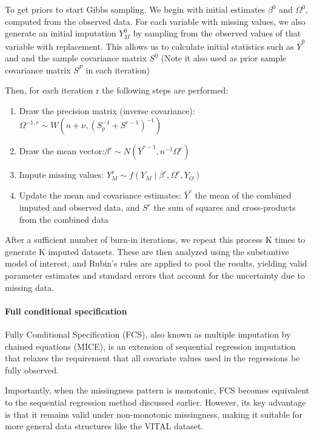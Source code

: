 \documentclass{article}
\begin{document}
To get priors to start Gibbs sampling. We begin with initial estimates
\(\beta^{0}\) and \(\Omega^{0}\), computed from the observed data. For
each variable with missing values, we also generate an initial
imputation \(Y_{M}^{0}\) by sampling from the observed values of that
variable with replacement. This allows us to calculate initial
statistics such as \(\overline{Y}^{0}\) and and the sample covariance
matrix \(S^{0}\) (Note it also used as prior sample covariance matrix
\(S^{P}\) in each iteration)

Then, for each iteration r the following steps are performed:

\begin{enumerate}
\def\labelenumi{\arabic{enumi}.}
\item
  Draw the precision matrix (inverse
  covariance):\(\Omega^{-1,r} \sim W(n + \nu, (S_p^{-1} + S^{r-1})^{-1})\)
\item
  Draw the mean
  vector:\(\beta^{r} \sim N(\bar{Y}^{r-1}, n^{-1} \Omega^r)\)
\item
  Impute missing values:
  \(Y_{M}^{r} \sim f(Y_{M} \mid \beta^{r}, \Omega^{r}, Y_{O})\)
\item
  Update the mean and covariance estimates: \(\bar{Y}^{r}\) the mean of
  the combined imputed and observed data, and \(S^{r}\) the sum of
  squares and cross-products from the combined data
\end{enumerate}

After a sufficient number of burn-in iterations, we repeat this process
K times to generate K imputed datasets. These are then analyzed using
the substantive model of interest, and Rubin's rules are applied to pool
the results, yielding valid parameter estimates and standard errors that
account for the uncertainty due to missing data.

\paragraph{Full conditional
specification}\label{full-conditional-specification}

Fully Conditional Specification (FCS), also known as multiple imputation
by chained equations (MICE), is an extension of sequential regression
imputation that relaxes the requirement that all covariate values used
in the regressions be fully observed.

Importantly, when the missingness pattern is monotonic, FCS becomes
equivalent to the sequential regression method discussed earlier.
However, its key advantage is that it remains valid under non-monotonic
missingness, making it suitable for more general data structures like
the VITAL dataset.
\end{document}
